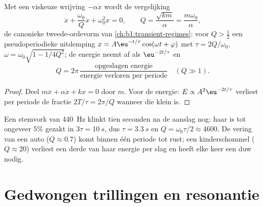 \begin{proposition}\label{prop:b1:oscillators-resonance:damped}
Met een viskeuze wrijving $-\alpha\dot x$ wordt de vergelijking
\[
\ddot x + \frac{\omega_0}{Q}\dot x + \omega_0^2x = 0, \qquad
Q = \frac{\sqrt{km}}{\alpha} = \frac{m\omega_0}{\alpha},
\]
de canonieke tweede-ordevorm van \cref{ch:b1:transient-regimes}: voor
$Q > \tfrac12$ een pseudoperiodieke uitdemping $x = A\eu^{-t/\tau}\cos(\omega t +
\varphi)$ met $\tau = 2Q/\omega_0$, $\omega = \omega_0\sqrt{1 - 1/4Q^2}$; de
energie neemt af als $\eu^{-2t/\tau}$ en
\[
Q = 2\pi\,\frac{\text{opgeslagen energie}}{\text{energie verloren per periode}}
\quad (Q \gg 1) .
\]
\end{proposition}

\begin{proof}
Deel $m\ddot x + \alpha\dot x + kx = 0$ door $m$. Voor de energie: $E
\propto A^2\eu^{-2t/\tau}$ verliest per periode de fractie $2T/\tau = 2\pi/Q$
wanneer die klein is.
\end{proof}

\begin{example}[Uitklinktijden]\label{ex:b1:oscillators-resonance:ringing}
Een stemvork van \qty{440}{Hz} klinkt tien seconden na de aanslag nog:
haar  is tot ongeveer $5\%$ gezakt in $3\tau = \qty{10}{s}$, dus
$\tau = \qty{3.3}{s}$ en $Q = \omega_0\tau/2 \approx 4600$. De vering van een
auto ($Q \approx 0.7$) komt binnen één periode tot rust; een kinderschommel
($Q \approx 20$) verliest een derde van haar energie per slag en heeft elke keer
een duw nodig.
\end{example}

\section{Gedwongen trillingen en resonantie}

